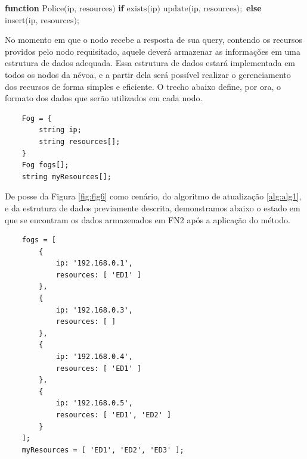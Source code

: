 \begin{algorithm}[htb]
    \begin{center}
        \begin{algorithmic}[1]
            \STATE \textbf{function} $\text{Police(ip, resources)}$
            \STATE \hspace{\algorithmicindent} \textbf{if} $\text{exists(ip)}$
            \STATE \hspace{\algorithmicindent} \hspace{\algorithmicindent} $\text{update(ip, resources)};$
            \STATE \hspace{\algorithmicindent} \textbf{else}
            \STATE \hspace{\algorithmicindent} \hspace{\algorithmicindent} $\text{insert(ip, resources)};$
        \end{algorithmic}
    \end{center}
    \caption[Política de atualização de recursos]%
        {\label{alg:alg1} Política de atualização de recursos.}%
    \end{algorithm}

No momento em que o nodo recebe a resposta de sua query, contendo os recursos providos pelo nodo requisitado, aquele deverá armazenar as informações em uma estrutura de dados adequada.
Essa estrutura de dados estará implementada em todos os nodos da névoa, e a partir dela será possível realizar o gerenciamento dos recursos de forma simples e eficiente.
O trecho abaixo define, por ora, o formato dos dados que serão utilizados em cada nodo.




\begin{verbatim}
    Fog = {
        string ip;
        string resources[];    
    }
    Fog fogs[];
    string myResources[];
\end{verbatim}

De posse da Figura \ref{fig:fig6} como cenário, do algoritmo de atualização \ref{alg:alg1}, e da estrutura de dados previamente descrita,
demonstramos abaixo o estado em que se encontram os dados armazenados em FN2 após a aplicação do método.

\begin{verbatim}
    fogs = [
        {
            ip: '192.168.0.1',
            resources: [ 'ED1' ]
        },
        {
            ip: '192.168.0.3',
            resources: [ ]
        },
        {
            ip: '192.168.0.4',
            resources: [ 'ED1' ]
        },
        {
            ip: '192.168.0.5',
            resources: [ 'ED1', 'ED2' ]
        }
    ];
    myResources = [ 'ED1', 'ED2', 'ED3' ];
\end{verbatim}

